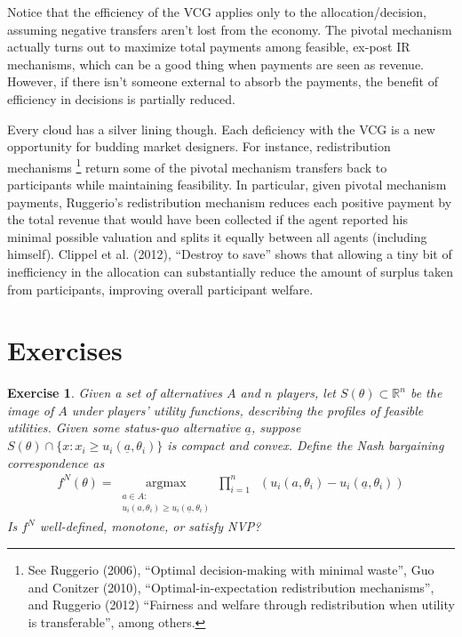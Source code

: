 \documentclass[letter, 10pt]{article}
\theoremstyle{basic}
\newtheorem{exercise}{Exercise}[section]
\newcommand{\R}{\mathbb{R}}
\begin{document}
\begin{spacing}{1.0}
\hspace{1em}
Notice that the efficiency of the VCG applies only to the
allocation/decision, assuming negative transfers aren't lost from the
economy. The pivotal mechanism actually turns out to maximize total
payments among feasible, ex-post IR mechanisms, which can be a good thing when
payments are seen as revenue. However, if there isn't someone external to
absorb the payments, the benefit of efficiency in decisions is partially
reduced. 

\hspace{1em}
Every cloud has a silver lining though. Each deficiency with the VCG is a
new opportunity for budding market designers. For instance, redistribution
mechanisms \footnote{See Ruggerio (2006), ``Optimal decision-making with
  minimal waste'', Guo and Conitzer (2010), ``Optimal-in-expectation
  redistribution mechanisms'', and Ruggerio (2012) ``Fairness and welfare
  through redistribution when utility is transferable'', among others.}
return some of the pivotal mechanism transfers back to participants while
maintaining feasibility. In particular, given pivotal mechanism payments,
Ruggerio's redistribution mechanism reduces each positive payment by the
total revenue that would have been collected if the agent reported his
minimal possible valuation and splits it equally between all agents
(including himself).  Clippel et al. (2012), ``Destroy to save'' shows that
allowing a tiny bit of inefficiency in the allocation can substantially
reduce the amount of surplus taken from participants, improving overall
participant welfare.

\newpage
\section{Exercises}
\label{sec:exercises}

\begin{exercise}
  Given a set of alternatives $A$ and $n$ players, let $S(\theta) \subset
  \R^n$ be the image of $A$ under players' utility functions, describing
  the profiles of feasible utilities. Given some status-quo alternative
  $\underline{a}$, suppose $S(\theta) \cap \{x: x_i \ge u_i(\underline{a},
  \theta_i)\}$ is compact and convex. Define the Nash bargaining
  correspondence as
  \begin{align*}
    f^N(\theta) = \underset{\substack{a \in A:\\ u_i(a, \theta_i) \ge
        u_i(\underline{a}, \theta_i)}}{\operatorname{argmax}}
    \prod_{i=1}^n \;\;\left(u_i(a, \theta_i)
    - u_i(\underline{a}, \theta_i)\right)
  \end{align*}
  Is $f^N$ well-defined, monotone, or satisfy NVP?


\end{exercise}
\end{spacing}
\end{document}
